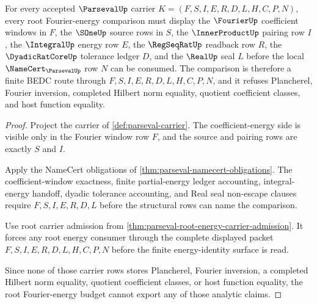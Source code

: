 \begin{theorem}
\label{thm:parseval-root-fourier-energy-budget}
For every accepted $\ParsevalUp$ carrier $K=(F,S,I,E,R,D,L,H,C,P,N)$, every root Fourier-energy comparison must display the $\FourierUp$ coefficient windows in $F$, the $\SOneUp$ source rows in $S$, the $\InnerProductUp$ pairing row $I$, the $\IntegralUp$ energy row $E$, the $\RegSeqRatUp$ readback row $R$, the $\DyadicRatCoreUp$ tolerance ledger $D$, and the $\RealUp$ seal $L$ before the local $\NameCert_{\ParsevalUp}$ row $N$ can be consumed. The comparison is therefore a finite BEDC route through $F,S,I,E,R,D,L,H,C,P,N$, and it refuses Plancherel, Fourier inversion, completed Hilbert norm equality, quotient coefficient classes, and host function equality.
\end{theorem}
\begin{proof}
Project the carrier of \autoref{def:parseval-carrier}. The coefficient-energy side is visible only in the Fourier window row $F$, and the source and pairing rows are exactly $S$ and $I$.

Apply the NameCert obligations of \autoref{thm:parseval-namecert-obligations}. The coefficient-window exactness, finite partial-energy ledger accounting, integral-energy handoff, dyadic tolerance accounting, and Real seal non-escape clauses require $F,S,I,E,R,D,L$ before the structural rows can name the comparison.

Use root carrier admission from \autoref{thm:parseval-root-energy-carrier-admission}. It forces any root energy consumer through the complete displayed packet $F,S,I,E,R,D,L,H,C,P,N$ before the finite energy-identity surface is read.

Since none of those carrier rows stores Plancherel, Fourier inversion, a completed Hilbert norm equality, quotient coefficient classes, or host function equality, the root Fourier-energy budget cannot export any of those analytic claims.
\end{proof}

